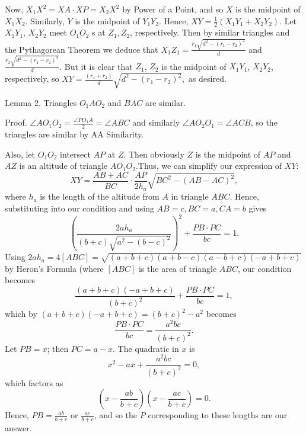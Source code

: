 \begin{enumerate}
 Now, $X_1 X^2 = XA \cdot XP = X_2 X^2$ by Power of a Point, and so $X$ is the midpoint of $X_1 X_2$. Similarly, $Y$ is the midpoint of $Y_1 Y_2$. Hence, $XY = \frac{1}{2} (X_1 Y_1 + X_2 Y_2).$ Let $X_1 Y_1$, $X_2 Y_2$ meet $O_1 O_2$ s at $Z_1, Z_2$, respectively. Then by similar triangles and the Pythagorean Theorem we deduce that $X_1 Z_1 = \frac{r_1 \sqrt{d^2 - (r_1 - r_2)^2}}{d}$ and $\frac{r_2 \sqrt{d^2 - (r_1 - r_2)^2}}{d}$. But it is clear that $Z_1$, $Z_2$ is the midpoint of $X_1 Y_1$, $X_2 Y_2$, respectively, so $XY = \frac{(r_1 + r_2)}{d} \sqrt{d^2 - (r_1 - r_2)^2},$ as desired.

 Lemma 2. Triangles $O_1 A O_2$ and $BAC$ are similar.

 Proof. $\angle{AO_1 O_2} = \frac{\angle{PO_1 A}}{2} = \angle{ABC}$ and similarly $\angle{AO_2 O_1} = \angle{ACB}$, so the triangles are similar by AA Similarity.

 Also, let $O_1 O_2$ intersect $AP$ at $Z$. Then obviously $Z$ is the midpoint of $AP$ and $AZ$ is an altitude of triangle $A O_1 O_2$.Thus, we can simplify our expression of $XY$:
 \[XY = \frac{AB + AC}{BC} \cdot \frac{AP}{2 h_a} \sqrt{BC^2 - (AB - AC)^2},\]where $h_a$ is the length of the altitude from $A$ in triangle $ABC$. Hence, substituting into our condition and using $AB = c, BC = a, CA = b$ gives
 \[\left( \frac{2a h_a}{(b+c) \sqrt{a^2 - (b-c)^2}} \right)^2 + \frac{PB \cdot PC}{bc} = 1.\]Using $2 a h_a = 4[ABC] = \sqrt{(a + b + c)(a + b - c)(a - b + c)(-a + b + c)}$ by Heron's Formula (where $[ABC]$ is the area of triangle $ABC$, our condition becomes
 \[\frac{(a + b + c)(-a + b + c)}{(b + c)^2} + \frac{PB \cdot PC}{bc} = 1,\]which by $(a + b + c)(-a + b + c) = (b + c)^2 - a^2$ becomes
 \[\frac{PB \cdot PC}{bc} = \frac{a^2 bc}{(b+c)^2}.\]Let $PB = x$; then $PC = a - x$. The quadratic in $x$ is
 \[x^2 - ax + \frac{a^2 bc}{(b+c)^2} = 0,\]which factors as
 \[\left(x - \frac{ab}{b+c}\right)\left(x - \frac{ac}{b+c}\right) = 0.\]Hence, $PB = \frac{ab}{b+c}$ or $\frac{ac}{b+c}$, and so the $P$ corresponding to these lengths are our answer.

 


\end{enumerate}